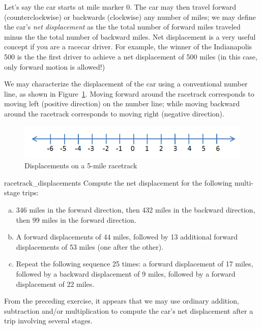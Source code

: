 Let's say the car starts at mile marker 0. The car may then travel forward (counterclockwise) or backwards (clockwise) any number of miles; we may define the car's  \emph{net displacement} as the the total number of forward miles traveled minus the the total number of backward miles. Net displacement is a very useful concept if you are a racecar driver. For example, the winner of the Indianapolis 500 is the the first driver to achieve a net displacement of 500 miles (in this case, only forward motion is allowed!)

We may characterize the displacement of the car using  
a conventional number line, as shown in Figure~\ref{fig:displacement}. Moving forward around the racetrack corresponds to moving left (positive direction) on the number line; while moving backward around the racetrack corresponds to moving right (negative direction).
\begin{figure}[h]\label{fig:displacement}
\begin{center}
\includegraphics[width=4.5in]{images/integer_line.png}
\end{center}
\caption{Displacements on a 5-mile racetrack}
\end{figure}

\begin{exercise}{racetrack_displacements}
Compute the net displacement for the following multi-stage trips:
\begin{enumerate}[(a)]
\item
346 miles in the forward direction, then 432 miles in the backward direction, then 99 miles in the forward direction.
\item A forward displacements of 44 miles, followed by 13 additional forward displacements of 53 miles (one after the other).
\item Repeat the following sequence 25 times: a forward displacement  of 17 miles, followed by a backward displacement of 9 miles, followed by a forward displacement of 22 miles.
\end{enumerate}
\end{exercise}
From the preceding exercise, it appears that we may use ordinary addition, subtraction and/or multiplication to compute the car's net displacement after a trip involving several stages.

